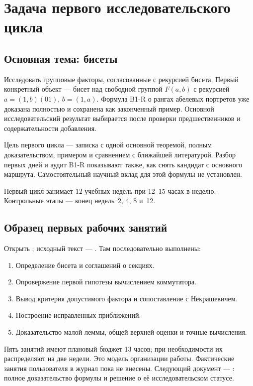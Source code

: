 \chapter{Задача первого исследовательского цикла}

\section{Основная тема: бисеты}
Исследовать групповые факторы, согласованные с рекурсией бисета.
Первый конкретный объект --- бисет над свободной группой \(F(a,b)\)
с рекурсией \(a=(1,b)(01)\), \(b=(1,a)\).
Формула B1-R о рангах абелевых портретов уже доказана полностью
и сохранена как законченный пример. Основной исследовательский результат
выбирается после проверки предшественников и содержательности добавления.

Цель первого цикла --- записка с одной основной теоремой,
полным доказательством, примером и сравнением с ближайшей литературой.
Разбор первых дней и аудит B1-R показывают также, как снять
кандидат с основного маршрута. Самостоятельный научный вклад
для этой формулы не установлен.

Первый цикл занимает 12 учебных недель при 12--15 часах в неделю.
Контрольные этапы --- конец недель~2, 4, 8 и~12.

\section{Образец первых рабочих занятий}
Открыть ; исходный текст ---
. Там последовательно выполнены:
\begin{enumerate}
\item Определение бисета и соглашений о секциях.
\item Опровержение первой гипотезы вычислением коммутатора.
\item Вывод критерия допустимого фактора и сопоставление с Некрашевичем.
\item Построение исправленных приближений.
\item Доказательство малой леммы, общей верхней оценки и точные вычисления.
\end{enumerate}
Пять занятий имеют плановый бюджет 13 часов; при необходимости
их распределяют на две недели. Это модель организации работы.
Фактические занятия пользователя в журнал пока не внесены.
Следующий документ --- : полное доказательство
формулы и решение о её исследовательском статусе.

